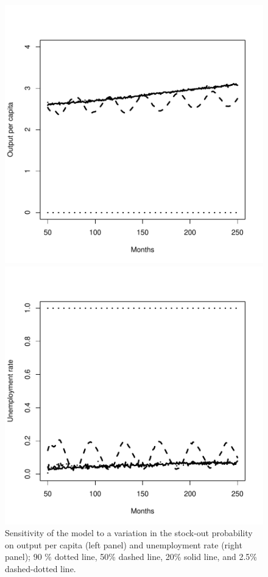 \begin{figure}[t]
\begin{minipage}[b]{.46\linewidth}
\centering\includegraphics[scale =0.4]{./robustness/gdp_quantil.pdf}
\end{minipage}\hfill
\begin{minipage}[b]{.46\linewidth}
\centering\includegraphics[scale=0.4]{./robustness/unemployment_quantil.pdf}
\end{minipage}
\caption{Sensitivity of the model to a variation in the stock-out probability on output per capita (left panel) and unemployment rate (right panel); 90 \% dotted line, 50\% dashed line, 20\% solid line, and 2.5\% dashed-dotted line.}
\label{parameter_variation}
\end{figure}


